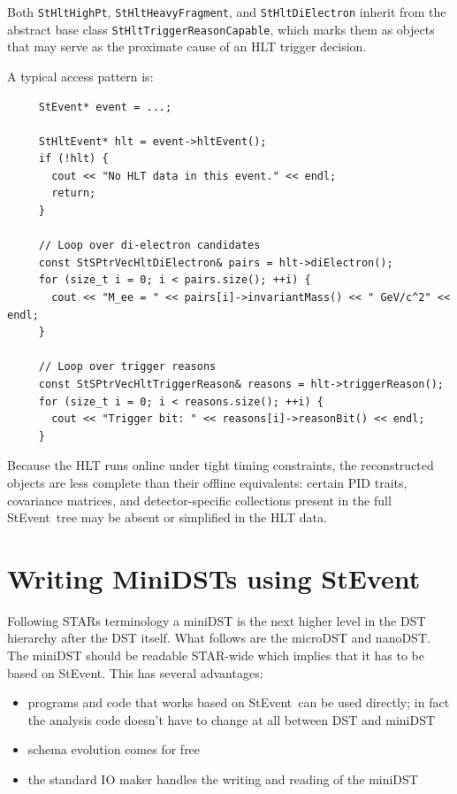 \documentclass[twoside]{article}
\newcommand{\StEvent}{\textsf{StEvent}}
\begin{document}
Both \texttt{StHltHighPt}, \texttt{StHltHeavyFragment}, and
\texttt{StHltDiElectron} inherit from the abstract base class
\texttt{StHltTriggerReasonCapable}, which marks them as objects that
may serve as the proximate cause of an HLT trigger decision.

A typical access pattern is:
\begin{verbatim}
     StEvent* event = ...;

     StHltEvent* hlt = event->hltEvent();
     if (!hlt) {
       cout << "No HLT data in this event." << endl;
       return;
     }

     // Loop over di-electron candidates
     const StSPtrVecHltDiElectron& pairs = hlt->diElectron();
     for (size_t i = 0; i < pairs.size(); ++i) {
       cout << "M_ee = " << pairs[i]->invariantMass() << " GeV/c^2" << endl;
     }

     // Loop over trigger reasons
     const StSPtrVecHltTriggerReason& reasons = hlt->triggerReason();
     for (size_t i = 0; i < reasons.size(); ++i) {
       cout << "Trigger bit: " << reasons[i]->reasonBit() << endl;
     }
\end{verbatim}

Because the HLT runs online under tight timing constraints, the
reconstructed objects are less complete than their offline equivalents:
certain PID traits, covariance matrices, and detector-specific
collections present in the full \StEvent\ tree may be absent or
simplified in the HLT data.

\section{Writing MiniDSTs using StEvent}
\label{sec:miniDST}
Following STARs terminology a miniDST is the next higher level in the
DST hierarchy after the DST itself. What follows are the
microDST and nanoDST.  The miniDST should be readable STAR-wide which
implies that it has to be based on \StEvent. This has several
advantages:
\begin{itemize}
\item programs and code that works based on \StEvent\ can be used
    directly; in fact the analysis code doesn't have to change at all
    between DST and miniDST
\item schema evolution comes for free
\item the standard IO maker handles the writing and reading of the
    miniDST
\end{itemize}
\end{document}
